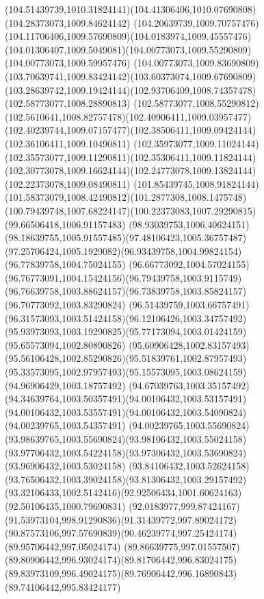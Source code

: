 {{	\curveto(104.51439739,1010.31824141)(104.41306406,1010.07690808)(104.28373073,1009.84624142)
	\curveto(104.20639739,1009.70757476)(104.11706406,1009.57690809)(104.0183974,1009.45557476)
	\curveto(104.01306407,1009.5049081)(104.00773073,1009.55290809)(104.00773073,1009.59957476)
	\curveto(104.00773073,1009.83690809)(103.70639741,1009.83424142)(103.60373074,1009.67690809)
	\curveto(103.28639742,1009.19424144)(102.93706409,1008.74357478)(102.58773077,1008.28890813)
	\curveto(102.58773077,1008.55290812)(102.5610641,1008.82757478)(102.40906411,1009.03957477)
	\curveto(102.40239744,1009.07157477)(102.38506411,1009.09424144)(102.36106411,1009.10490811)
	\curveto(102.35973077,1009.11024144)(102.35573077,1009.11290811)(102.35306411,1009.11824144)
	\curveto(102.30773078,1009.16624144)(102.24773078,1009.13824144)(102.22373078,1009.08490811)
	\curveto(101.85439745,1008.91824144)(101.58373079,1008.42490812)(101.2877308,1008.1475748)
	\curveto(100.79439748,1007.68224147)(100.22373083,1007.29290815)(99.66506418,1006.91157483)
	\curveto(98.93039753,1006.40624151)(98.18639755,1005.91557485)(97.48106423,1005.36757487)
	\curveto(97.25706424,1005.1929082)(96.93439758,1004.99824154)(96.77839758,1004.75024155)
	\curveto(96.66773092,1004.57024155)(96.76773091,1004.15424156)(96.79439758,1003.9115749)
	\curveto(96.76639758,1003.88624157)(96.73839758,1003.85824157)(96.70773092,1003.83290824)
	\curveto(96.51439759,1003.66757491)(96.31573093,1003.51424158)(96.12106426,1003.34757492)
	\curveto(95.93973093,1003.19290825)(95.77173094,1003.01424159)(95.65573094,1002.80890826)
	\curveto(95.60906428,1002.83157493)(95.56106428,1002.85290826)(95.51839761,1002.87957493)
	\curveto(95.33573095,1002.97957493)(95.15573095,1003.08624159)(94.96906429,1003.18757492)
	\curveto(94.67039763,1003.35157492)(94.34639764,1003.50357491)(94.00106432,1003.53157491)
	\curveto(94.00106432,1003.53557491)(94.00106432,1003.54090824)(94.00239765,1003.54357491)
	\curveto(94.00239765,1003.55690824)(93.98639765,1003.55690824)(93.98106432,1003.55024158)
	\curveto(93.97706432,1003.54224158)(93.97306432,1003.53690824)(93.96906432,1003.53024158)
	\curveto(93.84106432,1003.52624158)(93.76506432,1003.39024158)(93.81306432,1003.29157492)
	\curveto(93.32106433,1002.5142416)(92.92506434,1001.60624163)(92.50106435,1000.79690831)
	\curveto(92.0183977,999.87424167)(91.53973104,998.91290836)(91.31439772,997.89024172)
	\curveto(90.87573106,997.57690839)(90.46239774,997.25424174)(89.95706442,997.05024174)
	\curveto(89.86639775,997.01557507)(89.80906442,996.93024174)(89.81706442,996.83024175)
	\curveto(89.83973109,996.49024175)(89.76906442,996.16890843)(89.74106442,995.83424177)
}}
